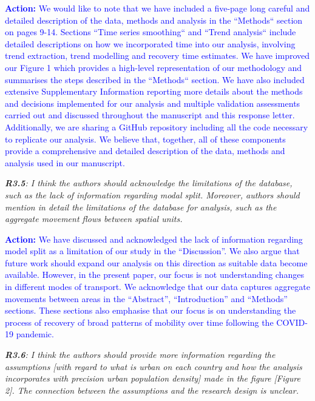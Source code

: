 \documentclass[12pt,a4paper,oneside, reqno]{amsart}
\begin{document}
\textcolor{blue}{\textbf{Action:} We would like to note that we have included a five-page long careful and detailed description of the data, methods and analysis in the ``Methods`` section on pages 9-14. Sections ``Time series smoothing`` and ``Trend analysis`` include detailed descriptions on how we incorporated time into our analysis, involving trend extraction, trend modelling and recovery time estimates. We have improved our Figure 1 which provides a high-level representation of our methodology and summarises the steps described in the ``Methods`` section. We have also included extensive Supplementary Information reporting more details about the methods and decisions implemented for our analysis and multiple validation assessments carried out and discussed throughout the manuscript and this response letter. Additionally, we are sharing a GitHub repository including all the code necessary to replicate our analysis. We believe that, together, all of these components provide a comprehensive and detailed description of the data, methods and analysis used in our manuscript.}

\setlength{\leftskip}{0cm} \textit{\textbf{R3.5}: I think the authors should acknowledge the limitations of the database, such as the lack of information regarding modal split. Moreover, authors should mention in detail the limitations of the database for analysis, such as the aggregate movement flows between spatial units.}

\setlength{\leftskip}{1cm}\textcolor{blue}{\textbf{Action:} We have discussed and acknowledged the lack of information regarding model split as a limitation of our study in the ``Discussion''. We also argue that future work should expand our analysis on this direction as suitable data become available. However, in the present paper, our focus is not understanding changes in different modes of transport. We acknowledge that our data captures aggregate movements between areas in the ``Abstract'', ``Introduction'' and ``Methods'' sections. These sections also emphasise that our focus is on understanding the process of recovery of broad patterns of mobility over time following the COVID-19 pandemic.  }


\setlength{\leftskip}{0cm} \textit{\textbf{R3.6}: I think the authors should provide more information regarding the assumptions [with regard to what is urban on each country and how the analysis incorporates with precision urban population density] made in the figure [Figure 2]. The connection between the assumptions and the research design is unclear.}
\end{document}
